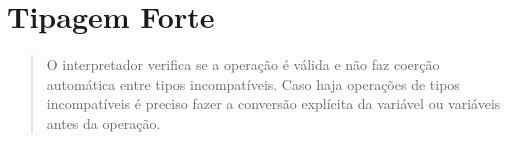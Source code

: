 \documentclass[letterpaper,10pt,brazil]{sphinxmanual}
\begin{document}
\begin{sphinxVerbatim}[commandchars=\\\{\}]
\end{sphinxVerbatim}

\begin{sphinxVerbatim}[commandchars=\\\{\}]
  
\end{sphinxVerbatim}

\begin{sphinxVerbatim}[commandchars=\\\{\}]
\end{sphinxVerbatim}


\section{Tipagem Forte}
\label{\detokenize{content/language_particularities:tipagem-forte}}\begin{quote}

O interpretador verifica se a operação é válida e não faz coerção automática entre tipos incompatíveis. Caso haja operações de tipos incompatíveis é preciso fazer a conversão explícita da variável ou variáveis antes da operação.
\end{quote}

\begin{sphinxVerbatim}[commandchars=\\\{\}]
  
  
\end{sphinxVerbatim}

\begin{sphinxVerbatim}[commandchars=\\\{\}]
\end{sphinxVerbatim}

\begin{sphinxVerbatim}[commandchars=\\\{\}]
\end{sphinxVerbatim}

\begin{sphinxVerbatim}[commandchars=\\\{\}]
\end{sphinxVerbatim}
\end{document}
